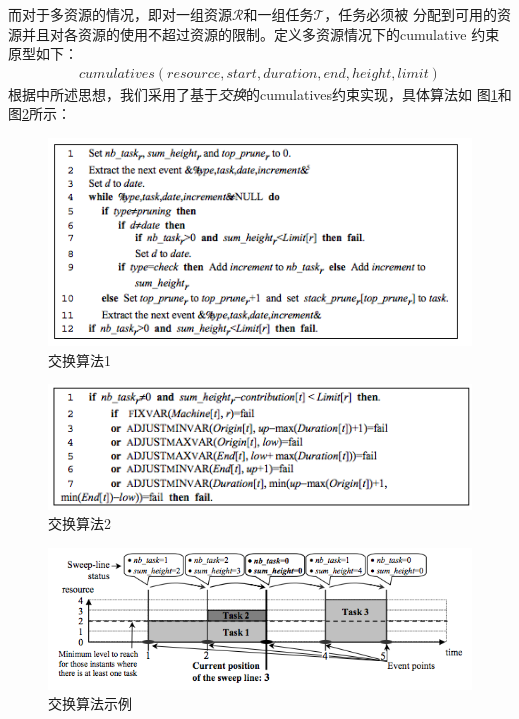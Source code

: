 \documentclass[UTF8]{ctexart}
\begin{document}
而对于多资源的情况，即对一组资源$\mathscr{R}$和一组任务$\mathscr{T}$，任务必须被
分配到可用的资源并且对各资源的使用不超过资源的限制。定义多资源情况下的cumulative
约束原型如下： 
	\begin{align*}
	cumulatives( resource, start, duration, end, height, limit)
	\end{align*}
根据\cite{cumulatives}中所述思想，我们采用了基于\textit{交换}的cumulatives约束实现，具体算法如
图\ref{al1_cum}和图\ref{al2_cum}所示：

\begin{figure}[h!]
	\includegraphics[width=\linewidth]{figure/al1_cum.png}
	\caption{交换算法1}
	\label{al1_cum}
\end{figure}

\begin{figure}[h!]
	\includegraphics[width=\linewidth]{figure/al2_cum.png}
	\caption{交换算法2}
	\label{al2_cum}
\end{figure}

\begin{figure}[h!]
	\includegraphics[width=\linewidth]{figure/illustrative_cum.png}
	\caption{交换算法示例}
	\label{ill_cum}
\end{figure}
\end{document}
